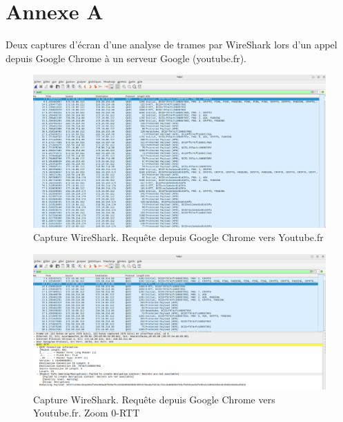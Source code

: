 \documentclass[a4paper,12pt]{article}
\begin{document}
\section{Annexe A}

Deux captures d'écran d'une analyse de trames par WireShark lors d'un appel depuis Google Chrome à un serveur Google (youtube.fr). 

\begin{figure}
    \centering
    \includegraphics[width=1\linewidth]{Wire Shark QUIC.png}
    \caption{Capture WireShark. Requête depuis Google Chrome vers Youtube.fr}
    \label{fig:QUIC1}
\end{figure}

\begin{figure}
    \centering
    \includegraphics[width=1\linewidth]{Wire Shark Capture QUIC.png}
    \caption{Capture WireShark. Requête depuis Google Chrome vers Youtube.fr. Zoom 0-RTT}
    \label{fig:QUIC1}
\end{figure}
\label{fin}
\end{document}
